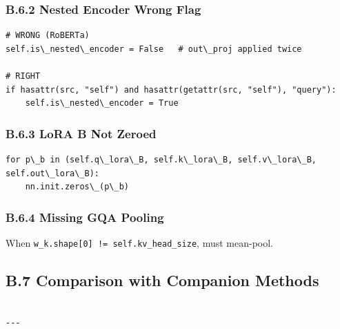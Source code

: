 \subsubsection{B.6.2 Nested Encoder Wrong Flag}

\begin{lstlisting}
# WRONG (RoBERTa)
self.is\_nested\_encoder = False   # out\_proj applied twice

# RIGHT
if hasattr(src, "self") and hasattr(getattr(src, "self"), "query"):
    self.is\_nested\_encoder = True
\end{lstlisting}

\subsubsection{B.6.3 LoRA B Not Zeroed}

\begin{lstlisting}
for p\_b in (self.q\_lora\_B, self.k\_lora\_B, self.v\_lora\_B, self.out\_lora\_B):
    nn.init.zeros\_(p\_b)
\end{lstlisting}

\subsubsection{B.6.4 Missing GQA Pooling}

When \texttt{w\_k.shape[0] != self.kv\_head\_size}, must mean-pool.

\subsection{B.7 Comparison with Companion Methods}

\begin{lstlisting}

---
\end{lstlisting}